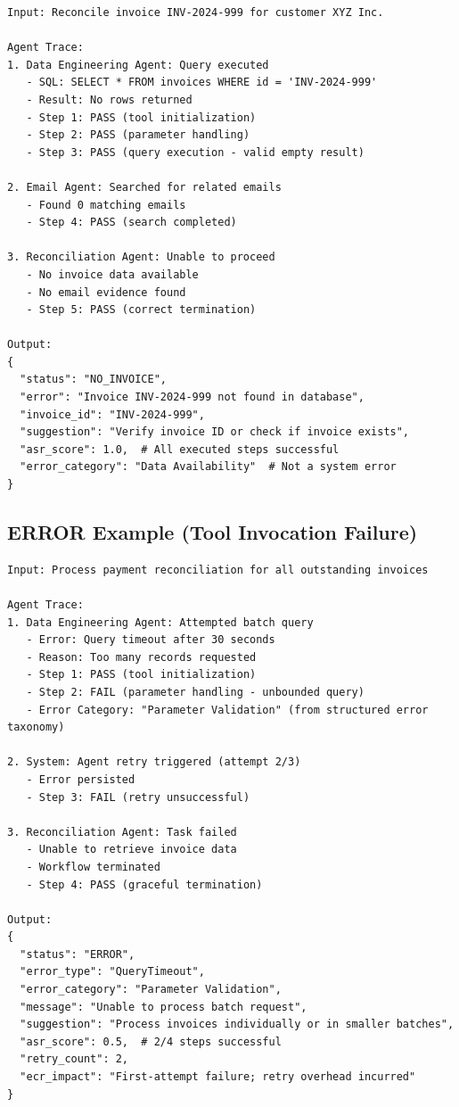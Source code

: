 \begin{verbatim}
Input: Reconcile invoice INV-2024-999 for customer XYZ Inc.

Agent Trace:
1. Data Engineering Agent: Query executed
   - SQL: SELECT * FROM invoices WHERE id = 'INV-2024-999'
   - Result: No rows returned
   - Step 1: PASS (tool initialization)
   - Step 2: PASS (parameter handling)
   - Step 3: PASS (query execution - valid empty result)

2. Email Agent: Searched for related emails
   - Found 0 matching emails
   - Step 4: PASS (search completed)

3. Reconciliation Agent: Unable to proceed
   - No invoice data available
   - No email evidence found
   - Step 5: PASS (correct termination)

Output:
{
  "status": "NO_INVOICE",
  "error": "Invoice INV-2024-999 not found in database",
  "invoice_id": "INV-2024-999",
  "suggestion": "Verify invoice ID or check if invoice exists",
  "asr_score": 1.0,  # All executed steps successful
  "error_category": "Data Availability"  # Not a system error
}
\end{verbatim}

\subsection{ERROR Example (Tool Invocation Failure)}

\begin{verbatim}
Input: Process payment reconciliation for all outstanding invoices

Agent Trace:
1. Data Engineering Agent: Attempted batch query
   - Error: Query timeout after 30 seconds
   - Reason: Too many records requested
   - Step 1: PASS (tool initialization)
   - Step 2: FAIL (parameter handling - unbounded query)
   - Error Category: "Parameter Validation" (from structured error taxonomy)

2. System: Agent retry triggered (attempt 2/3)
   - Error persisted
   - Step 3: FAIL (retry unsuccessful)

3. Reconciliation Agent: Task failed
   - Unable to retrieve invoice data
   - Workflow terminated
   - Step 4: PASS (graceful termination)

Output:
{
  "status": "ERROR",
  "error_type": "QueryTimeout",
  "error_category": "Parameter Validation",
  "message": "Unable to process batch request",
  "suggestion": "Process invoices individually or in smaller batches",
  "asr_score": 0.5,  # 2/4 steps successful
  "retry_count": 2,
  "ecr_impact": "First-attempt failure; retry overhead incurred"
}
\end{verbatim}

